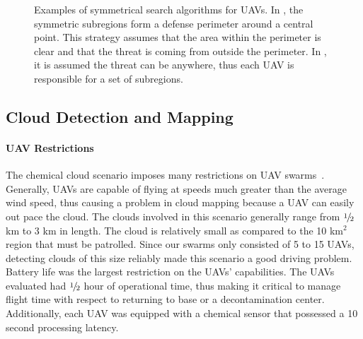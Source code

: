 \begin{figure}[ht]
  \centering
  \qquad
	\quad
\caption[Examples of symmetrical search algorithms for UAVs.]{Examples of symmetrical search algorithms for UAVs.  In , the symmetric subregions form a defense perimeter around a central point.  This strategy assumes that the area within the perimeter is clear and that the threat is coming from outside the perimeter.  In , it is assumed the threat can be anywhere, thus each UAV is responsible for a set of subregions.}
\label{fig:SearchAlgorithms}
\end{figure}

\subsection{Cloud Detection and Mapping}

\paragraph{UAV Restrictions\\} The chemical cloud scenario imposes many restrictions on UAV swarms~\cite{clough:PersonalCommunication}. Generally, UAVs are capable of flying at speeds much greater than the average wind speed, thus causing a problem in cloud mapping because a UAV can easily out pace the cloud. The clouds involved in this scenario generally range from $\raise.5ex\hbox{$\scriptstyle 1$}\kern-.1em/ \kern-.15em\lower.25ex\hbox{$\scriptstyle 2$} $ km to 3 km in length. The cloud is relatively small as compared to the 10 km$^{2}$ region that must be patrolled. Since our swarms only consisted of 5 to 15 UAVs, detecting clouds of this size reliably made this scenario a good driving problem. Battery life was the largest restriction on the UAVs' capabilities. The UAVs evaluated had $\raise.5ex\hbox{$\scriptstyle 1$}\kern-.1em/ \kern-.15em\lower.25ex\hbox{$\scriptstyle 2$} $ hour of operational time, thus making it critical to manage flight time with respect to returning to base or a decontamination center.  Additionally, each UAV was equipped with a chemical sensor that possessed a 10 second processing latency.

